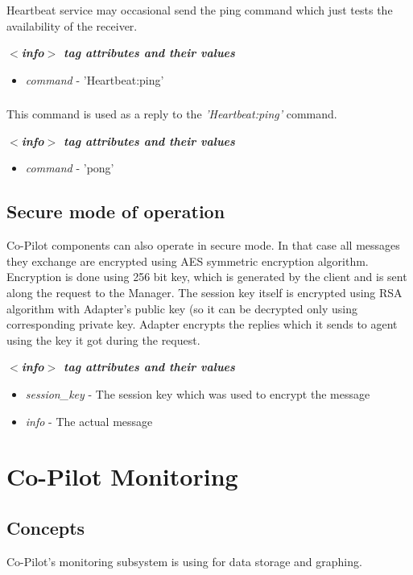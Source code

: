 Heartbeat service may occasional send the ping command which just tests the availability of the receiver.

\emph{\bf $<$info$>$ tag attributes and their values}
\begin{itemize}
  \item \emph{command} - 'Heartbeat:ping'
\end{itemize}

\subsubsection{}
\label{sct:heartbeatpong}

This command is used as a reply to the \emph{'Heartbeat:ping'} command.

\emph{\bf $<$info$>$ tag attributes and their values}
\begin{itemize}
  \item \emph{command} - 'pong'
\end{itemize}


\subsection{Secure mode of operation}

Co-Pilot components can also operate in secure mode. In that case all messages they exchange are encrypted using AES symmetric encryption algorithm. Encryption is done using 256 bit key, which is generated by the client and is sent along the request to the Manager. The session key itself is encrypted using RSA algorithm with Adapter's public key (so it can be decrypted only using corresponding private key. Adapter encrypts the replies which it sends to agent using the key it got during the request.

\emph{\bf $<$info$>$ tag attributes and their values}
\begin{itemize}
  \item \emph{session\_key} - The session key which was used to encrypt the message
  \item \emph{info} - The actual message
 \end{itemize}



\section{Co-Pilot Monitoring}

\subsection{Concepts}
Co-Pilot's monitoring subsystem is using \cite{graphite} for data storage and graphing.


